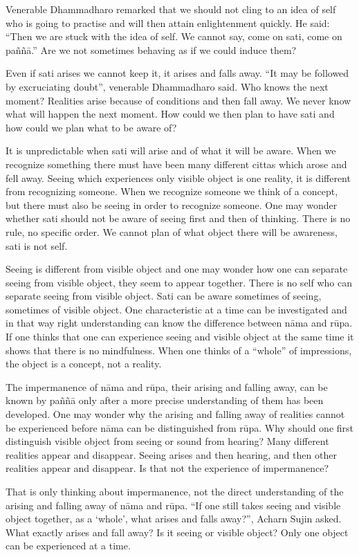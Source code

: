 Venerable Dhammadharo remarked that we should not cling to an idea of
self who is going to practise and will then attain enlightenment
quickly. He said: ``Then we are stuck with the idea of self. We cannot
say, come on sati, come on paññā.'' Are we not sometimes behaving as if
we could induce them?

Even if sati arises we cannot keep it, it arises and falls away. ``It
may be followed by excruciating doubt'', venerable Dhammadharo said. Who
knows the next moment? Realities arise because of conditions and then
fall away. We never know what will happen the next moment. How could we
then plan to have sati and how could we plan what to be aware of?

It is unpredictable when sati will arise and of what it will be aware.
When we recognize something there must have been many different cittas
which arose and fell away. Seeing which experiences only visible object
is one reality, it is different from recognizing someone. When we
recognize someone we think of a concept, but there must also be seeing
in order to recognize someone. One may wonder whether sati should not be
aware of seeing first and then of thinking. There is no rule, no
specific order. We cannot plan of what object there will be awareness,
sati is not self.

Seeing is different from visible object and one may wonder how one can
separate seeing from visible object, they seem to appear together. There
is no self who can separate seeing from visible object. Sati can be
aware sometimes of seeing, sometimes of visible object. One
characteristic at a time can be investigated and in that way right
understanding can know the difference between nāma and rūpa. If one
thinks that one can experience seeing and visible object at the same
time it shows that there is no mindfulness. When one thinks of a
``whole'' of impressions, the object is a concept, not a reality.

The impermanence of nāma and rūpa, their arising and falling away, can
be known by paññā only after a more precise understanding of them has
been developed. One may wonder why the arising and falling away of
realities cannot be experienced before nāma can be distinguished from
rūpa. Why should one first distinguish visible object from seeing or
sound from hearing? Many different realities appear and disappear.
Seeing arises and then hearing, and then other realities appear and
disappear. Is that not the experience of impermanence?

That is only thinking about impermanence, not the direct understanding
of the arising and falling away of nāma and rūpa. ``If one still takes
seeing and visible object together, as a `whole', what arises and falls
away?'', Acharn Sujin asked. What exactly arises and fall away? Is it
seeing or visible object? Only one object can be experienced at a time.

